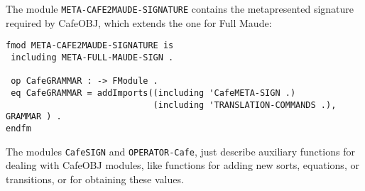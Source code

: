 The module \verb"META-CAFE2MAUDE-SIGNATURE" contains the metapresented signature
required by CafeOBJ, which extends the one for Full Maude:

{\codesize
\begin{verbatim}
fmod META-CAFE2MAUDE-SIGNATURE is
 including META-FULL-MAUDE-SIGN .

 op CafeGRAMMAR : -> FModule .
 eq CafeGRAMMAR = addImports((including 'CafeMETA-SIGN .)
                             (including 'TRANSLATION-COMMANDS .), GRAMMAR ) .
endfm
\end{verbatim}
}

The modules \verb"CafeSIGN" and \verb"OPERATOR-Cafe", just describe auxiliary functions
for dealing with CafeOBJ modules, like functions for adding new sorts, equations, or
transitions, or for obtaining these values.

